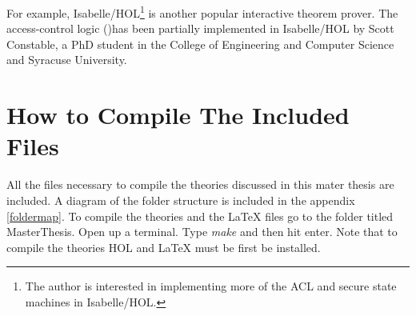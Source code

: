 \documentclass[../../main/main.tex]{subfiles}
\begin{document}
For example, Isabelle/HOL\footnote{The author is interested in implementing more of the ACL and secure state machines in Isabelle/HOL.} is another popular interactive theorem prover.  The access-control logic ()has been partially implemented in Isabelle/HOL by Scott Constable, a PhD student in the College of Engineering and Computer Science and Syracuse University.  

\section{How to Compile The Included Files}
All the files necessary to compile the theories discussed in this mater thesis are included.  A diagram of the folder structure is included in the appendix \ref{foldermap}.  To compile the theories and the LaTeX files go to the folder titled MasterThesis.  Open up a terminal.  Type \emph{make} and then hit enter.  Note that to compile the theories HOL and LaTeX must be first be installed.  
\end{document}

